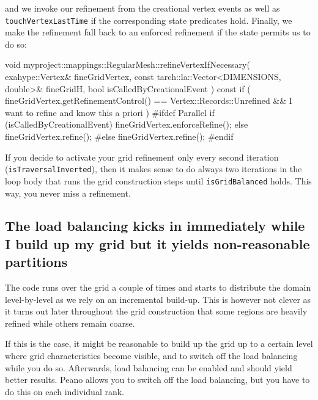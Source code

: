 \noindent
and we invoke our refinement from the creational vertex events as well as
\texttt{touchVertexLastTime} if the corresponding state predicates hold.
Finally, we make the refinement fall back to an enforced refinement if the state
permits us to do so:
\begin{code}
void myproject::mappings::RegularMesh::refineVertexIfNecessary(
  exahype::Vertex&                              fineGridVertex,
  const tarch::la::Vector<DIMENSIONS, double>&  fineGridH,
  bool                                          isCalledByCreationalEvent
) const {
  if (
    fineGridVertex.getRefinementControl() == Vertex::Records::Unrefined
    &&
    I want to refine and know this a priori
  ) {
    #ifdef Parallel
    if (isCalledByCreationalEvent) {
      fineGridVertex.enforceRefine();
    }
    else {
      fineGridVertex.refine();
    }
    #else
    fineGridVertex.refine();
    #endif
  }
}
\end{code}

\begin{remark}
If you decide to activate your grid refinement only every second iteration
(\texttt{isTraversalInverted}), then it makes sense to do always two iterations
in the loop body that runs the grid construction steps until
\texttt{isGridBalanced} holds. This way, you never miss a refinement. 
\end{remark}





\subsection{The load balancing kicks in immediately while I build up my grid but it
yields non-reasonable partitions}


\begin{smell}
The code runs over the grid a couple of times and starts to distribute the
domain level-by-level as we rely on an incremental build-up. This is however not
clever as it turns out later throughout the grid construction that some regions
are heavily refined while others remain coarse.
\end{smell}


\noindent
If this is the case, it might be reasonable to build up the grid up to a certain
level where grid characteristics become visible, and to switch off the load
balancing while you do so.
Afterwards, load balancing can be enabled and should yield better results. 
Peano allows you to switch off the load balancing, but you have to do this on
each individual rank. 

